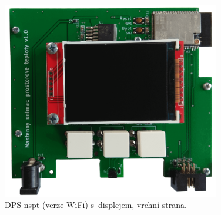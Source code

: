 \begin{figure}[H]
    \centering
    \includegraphics[width=0.85\textwidth]{images/nastenny-snimac-prostorove-teploty-wifi/dps-nastenny-snimac-prostorove-teploty-wifi-vrchni-cast-displej.png}
    \caption{DPS \acrshort{nspt} (verze WiFi) s~displejem, vrchní strana.}
    \label{fig:dps-nastenny-snimac-prostorove-teploty-wifi-vrchni-cast-displej}
\end{figure}